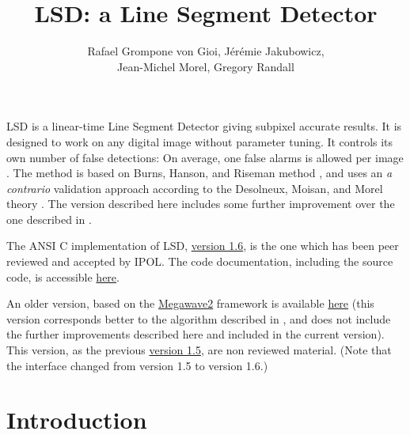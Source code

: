 \documentclass{ipol}
\begin{document}
\title{LSD: a Line Segment Detector}
\author{Rafael Grompone von Gioi, J\'er\'emie Jakubowicz,\\
        Jean-Michel Morel, Gregory Randall}
\date{}
\ipolMaketitle

\begin{ipolAbstract}
LSD is a linear-time Line Segment Detector giving subpixel accurate
results. It is designed to work on any digital image without parameter
tuning. It controls its own number of false detections: On average,
one false alarms is allowed per image \cite{lsd}. The method is based
on Burns, Hanson, and Riseman method \cite{burns}, and uses an \emph{a
  contrario} validation approach according to the Desolneux, Moisan,
and Morel theory \cite{dmm2000,dmm2008}. The version described here
includes some further improvement over the one described in
\cite{lsd}.
\end{ipolAbstract}

\begin{ipolCode}
The ANSI C implementation of LSD,
\href{http://www.ipol.im/pub/algo/gjmr_line_segment_detector/lsd_1.6.zip}%
{version 1.6}, is the one which has been peer reviewed and accepted by
IPOL. The code documentation, including the source code, is
accessible
\href{http://www.ipol.im/pub/algo/gjmr_line_segment_detector/doc}{here}.
\end{ipolCode}

\begin{ipolSupp}
An older version, based on
the \href{http://megawave.cmla.ens-cachan.fr/}{Megawave2} framework is
available
\href{http://www.ipol.im/pub/algo/gjmr_line_segment_detector/lsd.zip}{here}
(this version corresponds better to the algorithm described
in \cite{lsd}, and does not include the further improvements described
here and included in the current version). This version, as the
previous
\href{http://www.ipol.im/pub/algo/gjmr_line_segment_detector/lsd-1.5.zip}{%
version 1.5}, are non reviewed
material. (Note that the interface changed from version 1.5 to version
1.6.)
\end{ipolSupp}

\section{Introduction}
\end{document}
